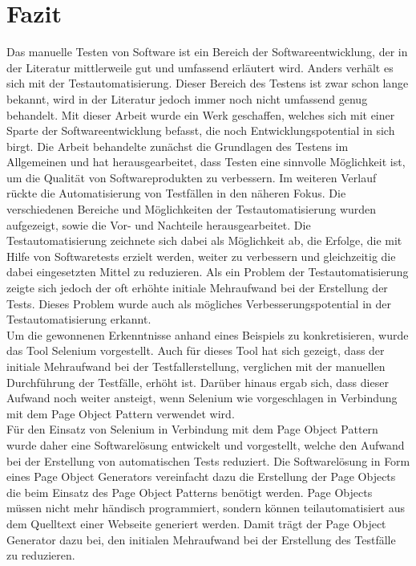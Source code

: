 \chapter{Fazit}
\label{sec:fazit}
Das manuelle Testen von Software ist ein Bereich der Softwareentwicklung, der in der Literatur mittlerweile gut und umfassend erläutert wird. Anders verhält es sich mit der Testautomatisierung. Dieser Bereich des Testens ist zwar schon lange bekannt, wird in der Literatur jedoch immer noch nicht umfassend genug behandelt. Mit dieser Arbeit wurde ein Werk geschaffen, welches sich mit einer Sparte der Softwareentwicklung befasst, die noch Entwicklungspotential in sich birgt. 
Die Arbeit behandelte zunächst die Grundlagen des Testens im Allgemeinen und hat herausgearbeitet, dass Testen eine sinnvolle Möglichkeit ist, um die Qualität von Softwareprodukten zu verbessern. 
Im weiteren Verlauf rückte die Automatisierung von Testfällen in den näheren Fokus. Die verschiedenen Bereiche und Möglichkeiten der Testautomatisierung wurden aufgezeigt, sowie die Vor- und Nachteile herausgearbeitet.
Die Testautomatisierung zeichnete sich dabei als Möglichkeit ab, die Erfolge, die mit Hilfe von Softwaretests erzielt werden, weiter zu verbessern und gleichzeitig die dabei eingesetzten Mittel zu reduzieren. Als ein Problem der Testautomatisierung zeigte sich jedoch der oft erhöhte initiale Mehraufwand bei der Erstellung der Tests. Dieses Problem wurde auch als mögliches Verbesserungspotential in der Testautomatisierung erkannt.\\
Um die gewonnenen Erkenntnisse anhand eines Beispiels zu konkretisieren, wurde das Tool Selenium vorgestellt.
Auch für dieses Tool hat sich gezeigt, dass der initiale Mehraufwand bei der Testfallerstellung, verglichen mit der manuellen Durchführung der Testfälle, erhöht ist. Darüber hinaus ergab sich, dass dieser Aufwand noch weiter ansteigt, wenn Selenium wie vorgeschlagen in Verbindung mit dem Page Object Pattern verwendet wird.\\
Für den Einsatz von Selenium in Verbindung mit dem Page Object Pattern wurde daher eine Softwarelösung entwickelt und vorgestellt, welche den Aufwand bei der Erstellung von automatischen Tests reduziert.
Die Softwarelösung in Form eines Page Object Generators vereinfacht dazu die Erstellung der Page Objects die beim Einsatz des Page Object Patterns benötigt werden. Page Objects müssen nicht mehr händisch programmiert, sondern können teilautomatisiert aus dem Quelltext einer Webseite generiert werden. Damit trägt der Page Object Generator dazu bei, den initialen Mehraufwand bei der Erstellung des Testfälle zu reduzieren.

